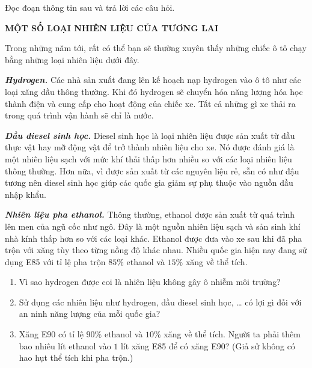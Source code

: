 \documentclass[Main.tex]{subfiles}
\begin{document}
\begin{bt}%
	Đọc đoạn thông tin sau và trả lời các câu hỏi.
	\begin{center}
		\textbf{MỘT SỐ LOẠI NHIÊN LIỆU CỦA TƯƠNG LAI}
	\end{center}
	Trong những năm tới, rất có thể bạn sẽ thường xuyên thấy những chiếc ô tô chạy bằng những loại nhiên liệu dưới đây.

	\textbf{\textit{Hydrogen.}} Các nhà sản xuất đang lên kế hoạch nạp hydrogen vào ô tô như các loại xăng dầu thông thường. Khi đó hydrogen sẽ chuyển hóa năng lượng hóa học thành điện và cung cấp cho hoạt động của chiếc xe. Tất cả những gì xe thải ra trong quá trình vận hành sẽ chỉ là nước.

	\textbf{\textit{Dầu diesel sinh học.}} Diesel sinh học là loại nhiên liệu được sản xuất từ dầu thực vật hay mỡ động vật để trở thành nhiên liệu cho xe. Nó được đánh giá là một nhiên liệu sạch với mức khí thải thấp hơn nhiều so với các loại nhiên liệu thông thường. Hơn nữa, vì được sản xuất từ các nguyên liệu rẻ, sẵn có như đậu tương nên diesel sinh học giúp các quốc gia giảm sự phụ thuộc vào nguồn dầu nhập khẩu.

	\textbf{\textit{Nhiên liệu pha ethanol.}} Thông thường, ethanol được sản xuất từ quá trình lên men của ngũ cốc như ngô. Đây là một nguồn nhiên liệu sạch và sản sinh khí nhà kính thấp hơn so với các loại khác. Ethanol được đưa vào xe sau khi đã pha trộn với xăng tùy theo từng nồng độ khác nhau. Nhiều quốc gia hiện nay đang sử dụng E85 với tỉ lệ pha trộn $85\%$ ethanol và $15\%$ xăng về thể tích.
	\begin{enumerate}
		\item[(a)] Vì sao hydrogen được coi là nhiên liệu không gây ô nhiễm môi trường?
		\item[(b)] Sử dụng các nhiên liệu như hydrogen, dầu diesel sinh học, … có lợi gì đối với an ninh năng lượng của mỗi quốc gia?
		\item[(c)] Xăng E90 có tỉ lệ $90\%$ ethanol và $10\%$ xăng về thể tích. Người ta phải thêm bao nhiêu lít ethanol vào $1$ lít xăng E85 để có xăng E90? (Giả sử không có hao hụt thể tích khi pha trộn.)
	\end{enumerate}
\end{bt}
\end{document}
